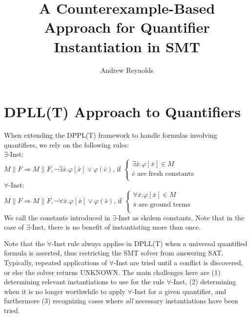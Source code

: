 \documentclass{llncs}
\begin{document}
\pagestyle{plain}

\title{A Counterexample-Based Approach for Quantifier Instantiation in SMT}

\author{Andrew Reynolds}

\date{}

\maketitle
\thispagestyle{empty}

\section{DPLL(T) Approach to Quantifiers}

When extending the DPPL(T) framework to handle formulas involving quantifiers, we rely on the following rules: \\

\noindent $\exists$-Inst: \\

$M \parallel F \Longrightarrow M \parallel F, \neg \exists \bar{x}. \varphi[ \bar{ x } ] \vee \varphi( \bar{ c } )$, if   
$\begin{cases}
  \exists \bar{x}. \varphi[ \bar{ x } ] \in M \\
  \bar{ c } \text{ are fresh constants} \\
\end{cases}$ \\

\noindent $\forall$-Inst: \\

$M \parallel F \Longrightarrow M \parallel F, \neg \forall \bar{x}. \varphi[ \bar{ x } ] \vee \varphi( \bar{ s } )$, if   
$\begin{cases}
  \forall \bar{x}. \varphi[ \bar{ x } ] \in M \\
  \bar{ s } \text{ are ground terms} \\
\end{cases}$ \\

We call the constants introduced in $\exists$-Inst as skolem constants.
Note that in the case of $\exists$-Inst, there is no benefit of instantiating more than once.

Note that the $\forall$-Inst rule always applies in DPLL(T) when a universal quantified formula is asserted, thus restricting the SMT solver from answering SAT.
Typically, repeated applications of $\forall$-Inst are tried until a conflict is discovered, or else the solver returns UNKNOWN.
The main challenges here are (1) determining relevant instantiations to use for the rule $\forall$-Inst, (2) determining when it is no longer worthwhile to apply $\forall$-Inst for a given quantifier, and furthermore (3) recognizing cases where \emph{all} necessary instantiations have been tried.
\end{document}
